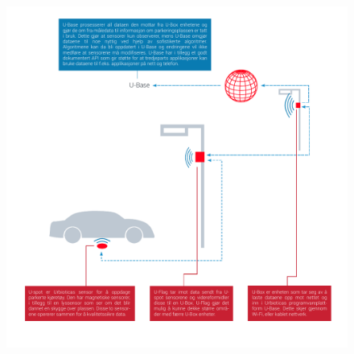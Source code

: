 \documentclass[a4paper, norsk, 12pt]{article}
\theoremstyle{remark}
\begin{document}
\begin{figure}[H]
\centering
\centerline{\includegraphics[scale=1.0, clip=true, trim=1cm 1.0cm 0.5cm 0.5cm]{grafikk/urbiotica.pdf}}
\end{figure}
\end{document}
